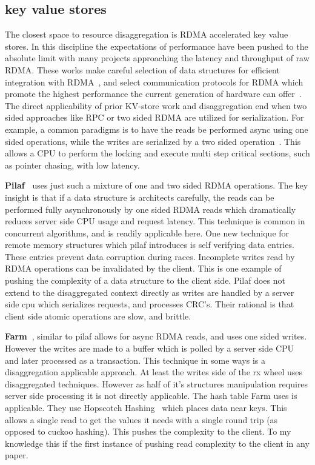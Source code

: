 \subsection{key value stores} 
The closest space to resource disaggregation is RDMA accelerated key value
stores. In this discipline the expectations of performance have been pushed to
the absolute limit with many projects approaching the latency and throughput of
raw RDMA. These works make careful selection of data structures for efficient
integration with RDMA~\cite{hopscotch,cuckoo}, and select communication
protocols for RDMA which promote the highest performance the current generation
of hardware can offer~\cite{herd,storm}. The direct applicability of prior
KV-store work and disaggregation end when two sided approaches like RPC or two
sided RDMA are utilized for serialization. For example, a common paradigms is to
have the reads be performed async using one sided operations, while the writes
are serialized by a two sided operation~\cite{pilaf}. This allows a CPU to
perform the locking and execute multi step critical sections, such as pointer
chasing, with low latency.

\textbf{Pilaf~\cite{pilaf}} uses just such a mixture of one and two sided RDMA
operations. The key insight is that if a data structure is architects carefully,
the reads can be performed fully asynchronously by one sided RDMA reads which
dramatically reduces server side CPU usage and request latency. This technique
is common in concurrent algorithms, and is readily applicable here. One new
technique for remote memory structures which pilaf introduces is self verifying
data entries. These entries prevent data corruption during races. Incomplete
writes read by RDMA operations can be invalidated by the client. This is one
example of pushing the complexity of a data structure to the client side. Pilaf
does not extend to the disaggregated context directly as writes are handled by a
server side cpu which serializes requests, and processes CRC's. Their rational
is that client side atomic operations are slow, and brittle. 

\textbf{Farm~\cite{farm}}, similar to pilaf allows for async RDMA reads, and
uses one sided writes. However the writes are made to a buffer which is polled
by a server side CPU and later processed as a transaction. This technique in
some ways is a disaggregation applicable approach. At least the writes side of
the rx wheel uses disaggregated techniques. However as half of it's structures
manipulation requires server side processing it is not directly applicable. The
hash table Farm uses is applicable. They use Hopscotch Hashing~\cite{hopscotch}
which places data near keys. This allows a single read to get the values it
needs with a single round trip (as opposed to cuckoo hashing). This pushes the
complexity to the client. To my knowledge this if the first instance of pushing
read complexity to the client in any paper.

